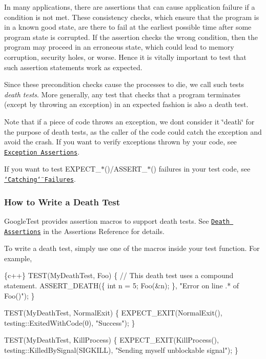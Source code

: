 In many applications, there are assertions that can cause application failure if a condition is not met. These consistency checks, which ensure that the program is in a known good state, are there to fail at the earliest possible time after some program state is corrupted. If the assertion checks the wrong condition, then the program may proceed in an erroneous state, which could lead to memory corruption, security holes, or worse. Hence it is vitally important to test that such assertion statements work as expected.

Since these precondition checks cause the processes to die, we call such tests {\itshape death tests}. More generally, any test that checks that a program terminates (except by throwing an exception) in an expected fashion is also a death test.

Note that if a piece of code throws an exception, we don\textquotesingle{}t consider it \char`\"{}death\char`\"{} for the purpose of death tests, as the caller of the code could catch the exception and avoid the crash. If you want to verify exceptions thrown by your code, see \href{#ExceptionAssertions}{\tt Exception Assertions}.

If you want to test {\ttfamily E\+X\+P\+E\+C\+T\+\_\+$\ast$()/\+A\+S\+S\+E\+R\+T\+\_\+$\ast$()} failures in your test code, see \href{#catching-failures}{\tt \char`\"{}\+Catching\char`\"{} Failures}.

\subsubsection*{How to Write a Death Test}

Google\+Test provides assertion macros to support death tests. See \href{reference/assertions.md#death}{\tt Death Assertions} in the Assertions Reference for details.

To write a death test, simply use one of the macros inside your test function. For example,


\begin{DoxyCode}
\{c++\}
TEST(MyDeathTest, Foo) \{
  // This death test uses a compound statement.
  ASSERT\_DEATH(\{
    int n = 5;
    Foo(&n);
  \}, "Error on line .* of Foo()");
\}

TEST(MyDeathTest, NormalExit) \{
  EXPECT\_EXIT(NormalExit(), testing::ExitedWithCode(0), "Success");
\}

TEST(MyDeathTest, KillProcess) \{
  EXPECT\_EXIT(KillProcess(), testing::KilledBySignal(SIGKILL),
              "Sending myself unblockable signal");
\}
\end{DoxyCode}


